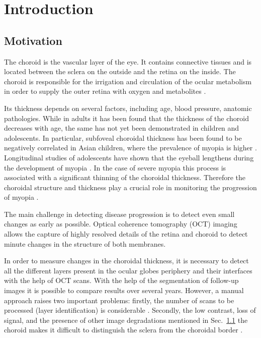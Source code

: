 \documentclass[12pt,a4paper]{scrartcl}
\begin{document}
\newpage
{}
\tableofcontents



\newpage
{}

\section{Introduction}\label{s:introduction} 
\subsection{Motivation}\label{ss:motivation}
The choroid is the vascular layer of the eye. It contains connective tissues and is located between the sclera on the outside and the retina on the inside. The choroid is responsible for the irrigation and circulation of the ocular metabolism in order to supply the outer retina with oxygen and metabolites \cite{choroidExpl}.

Its thickness depends on several factors, including age, blood pressure, anatomic pathologies. While in adults it has been found that the thickness of the choroid decreases with age, the same has not yet been demonstrated in children and adolescents. In particular, subfoveal choroidal thickness has been found to be negatively correlated in Asian children, where the prevalence of myopia is higher \cite{Ronchetti2019}. Longitudinal studies of adolescents have shown that the eyeball lengthens during the development of myopia \cite{Ronchetti2018}. In the case of severe myopia this process is associated with a significant thinning of the choroidal thickness. Therefore the choroidal structure and thickness play a crucial role in monitoring the progression of myopia \cite{Ronchetti2019}.

The main challenge in detecting disease progression is to detect even small changes as early as possible. Optical coherence tomography (OCT) imaging allows the capture of highly resolved details of the retina and choroid to detect minute changes in the structure of both membranes\cite{Ronchetti2019}.

In order to measure changes in the choroidal thickness, it is necessary to detect all the different layers present in the ocular globe\textquotesingle s periphery and their interfaces with the help of OCT scans. With the help of the segmentation of follow-up images it is possible to compare results over several years. 
However, a manual approach raises two important problems: firstly, the number of scans to be processed (layer identification) is considerable \cite{Maloca2019}. Secondly, the low contrast, loss of signal, and the presence of other image degradations mentioned in Sec.~\ref{ss:motivation} the choroid makes it difficult to distinguish the sclera from the choroidal border \cite{Ronchetti2019}.
\end{document}
